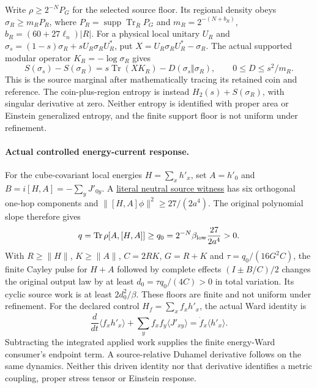 Write $\rho\ge2^{-N}P_G$ for the selected source floor. Its regional density obeys
$\sigma_R\ge m_RP_R$, where $P_R=\operatorname{supp}\operatorname{Tr}_{\bar R}P_G$
and $m_R=2^{-(N+b_R)}$, $b_R=(60+27\ell_n)|R|$.
For a physical local unitary $U_R$ and
$\sigma_s=(1-s)\sigma_R+sU_R\sigma_RU_R^*$, put
$X=U_R\sigma_RU_R^*-\sigma_R$. The actual supported modular operator
$K_R=-\log\sigma_R$ gives
\[
 S(\sigma_s)-S(\sigma_R)
 =s\operatorname{Tr}(XK_R)-D(\sigma_s\Vert\sigma_R),
 \qquad 0\le D\le s^2/m_R.
\]
This is the source marginal after mathematically tracing its retained
coin and reference. The coin-plus-region entropy is instead
$H_2(s)+S(\sigma_R)$, with singular derivative at zero. Neither entropy
is identified with proper area or Einstein generalized entropy, and the
finite support floor is not uniform under refinement.

\paragraph{Actual controlled energy-current response.}
For the cube-covariant local energies $H=\sum_xh'_x$, set
$A=h'_0$ and $B=i[H,A]=-\sum_yJ'_{0y}$. A
\href{https://github.com/FloatingPragma/observer-patch-holography/blob/main/model/particle_primary_energy_response/PROOF.md}{literal neutral source witness}
has six orthogonal one-hop components and
$\|[H,A]\phi\|^2\ge27/(2a^4)$. The original polynomial slope therefore gives
\[
 q=\operatorname{Tr}\rho[A,[H,A]]
   \ge q_0=2^{-N}\beta_{\rm low}\frac{27}{2a^4}>0.
\]
With $R\ge\|H\|$, $K\ge\|A\|$, $C=2RK$, $G=R+K$ and
$\tau=q_0/(16G^2C)$, the finite Cayley pulse for $H+A$ followed by
complete effects $(I\pm B/C)/2$ changes the original output law by
at least $d_0=\tau q_0/(4C)>0$ in total variation. Its cyclic source
work is at least $2d_0^2/\beta$. These floors are finite and not uniform
under refinement. For the declared control $H_f=\sum_xf_xh'_x$, the
actual Ward identity is
\[
 \frac{d}{dt}\langle f_xh'_x\rangle
   +\sum_y f_xf_y\langle J'_{xy}\rangle
       =\dot f_x\langle h'_x\rangle.
\]
Subtracting the integrated applied work supplies the finite energy-Ward
consumer's endpoint term. A source-relative Duhamel derivative follows
on the same dynamics. Neither this driven identity nor that derivative
identifies a metric coupling, proper stress tensor or Einstein response.

